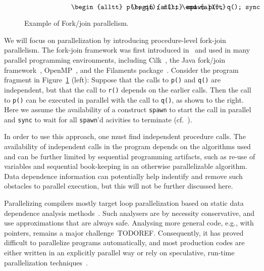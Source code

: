 \documentclass{acm_proc_article-sp}
\begin{document}
\begin{figure}
\small
\hrulefill
\[
\begin{minipage}[t]{3cm}
\begin{alltt}
   p();
   q();
   r();
\end{alltt}
\end{minipage}
\begin{minipage}[t]{3cm}
\begin{alltt}
   spawn p();
   q();
   sync;
   r();
\end{alltt}
\end{minipage} 
\]
\hrulefill
\caption{Example of Fork/join parallelism.}
\label{fforkjoin}
\end{figure}

We will focus on parallelization by introducing procedure-level
fork-join parallelism. The fork-join framework was first introduced
in~\cite{Conway63} and used in many parallel programming environments,
including Cilk~\cite{BJKLR96}, the Java fork/join
framework~\cite{Lea00}, OpenMP~\cite{DM98}, and the Filaments
package~\cite{LF00}. Consider the program fragment in
Figure~\ref{fforkjoin} (left):
Suppose that the calls to {\tt p()} and {\tt q()} are independent,
but that the call to {\tt r()} depends on the earlier calls. Then
the call to {\tt p()} can be
executed in parallel with
the call to {\tt q()}, as shown to the right.
Here we assume the availability of a construct {\tt spawn} to start
the call in parallel and {\tt sync} to wait for all {\tt spawn}'d
acivities to terminate (cf.~\cite{BJKLR96}).

In order to use this approach, one must find independent
procedure calls.  The availability of independent
calls in the program depends on the algorithms used and can be further
limited by sequential programming artifacts, such as re-use of
variables and sequential book-keeping in an otherwise parallelizable
algorithm.  Data dependence information can potentially help
indentify and remove such obstacles to parallel execution, but this
will not be further discussed here.

Parallelizing compilers mostly target loop parallelization based on
static data dependence analysis methods~\cite{KA02}.  Such analysers are
by necessity conservative, and use
approximations that are always safe.  
Analysing more general code, e.g., with pointers, remains a major
challenge~TODOREF\cite{}.  Consequently, it has proved difficult to
parallelize programs automatically, and most production codes are either
written in an explicitly parallel way or rely on speculative, run-time
parallelization techniques~\cite{PO03,CL03}.
\end{document}
